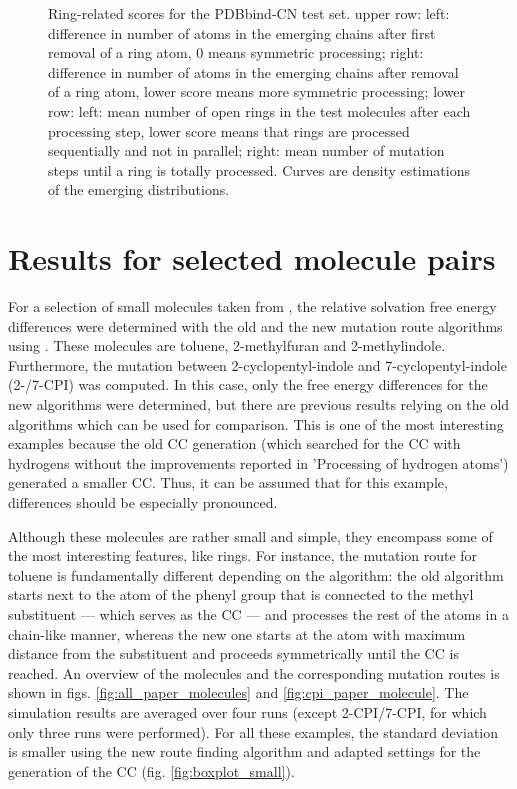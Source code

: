 \begin{figure}
	\caption{Ring-related scores for the PDBbind-CN test set. upper row: left: difference in number of atoms in the emerging chains after first removal of a ring atom, 0 means symmetric processing; right: difference in number of atoms in the emerging chains after removal of a ring atom, lower score means more symmetric processing; lower row: left: mean number of open rings in the test molecules after each processing step, lower score means that rings are processed sequentially and not in parallel; right: mean number of mutation steps until a ring is totally processed. Curves are density estimations of the emerging distributions.}
	
\end{figure}



\section{Results for selected molecule pairs}

For a selection of small molecules taken from \cite{Loeffler.2018, Wieder.2022}, the relative solvation free energy differences were determined with the old and the new mutation route algorithms  using {\trafo}. These molecules are toluene, 2-methylfuran and 2-methylindole.
Furthermore, the mutation between 2-cyclopentyl-indole and 7-cyclopentyl-indole (2-/7-CPI) was computed. In this case, only the free energy differences for the new algorithms were determined, but there are previous results relying on the old algorithms which can be used for comparison. This is one of the most interesting examples because the old CC generation (which searched for the CC with hydrogens without the improvements reported in 'Processing of hydrogen atoms') generated a smaller CC. Thus, it can be assumed that for this example, differences should be especially pronounced.

Although these molecules are rather small and simple, they encompass some of the most interesting features, like rings. For instance, the mutation route for toluene is fundamentally different depending on the algorithm: the old algorithm starts next to the atom of the phenyl group that is connected to the methyl substituent --- which serves as the CC --- and processes the rest of the atoms in a chain-like manner, whereas the new one starts at the atom with maximum distance from the substituent and proceeds symmetrically until the CC is reached.
An overview of the molecules and the corresponding mutation routes is shown in figs. \ref{fig:all_paper_molecules} and \ref{fig:cpi_paper_molecule}.
The simulation results are averaged over four runs (except 2-CPI/7-CPI, for which only three runs were performed). 
For all these examples, the standard deviation is smaller using the new route finding algorithm and adapted settings for the generation of the CC (fig. \ref{fig:boxplot_small}).


